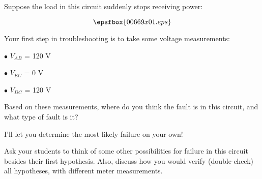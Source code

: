 

Suppose the load in this circuit suddenly stops receiving power:

$$\epsfbox{00669x01.eps}$$

Your first step in troubleshooting is to take some voltage measurements:

\medskip
\item{$\bullet$} $V_{AB}$ = 120 V
\item{$\bullet$} $V_{EC}$ = 0 V
\item{$\bullet$} $V_{DC}$ = 120 V
\medskip

Based on these measurements, where do you think the fault is in this circuit, and what type of fault is it?







I'll let you determine the most likely failure on your own!







Ask your students to think of some other possibilities for failure in this circuit besides their first hypothesis.  Also, discuss how you would verify (double-check) all hypotheses, with different meter measurements.




